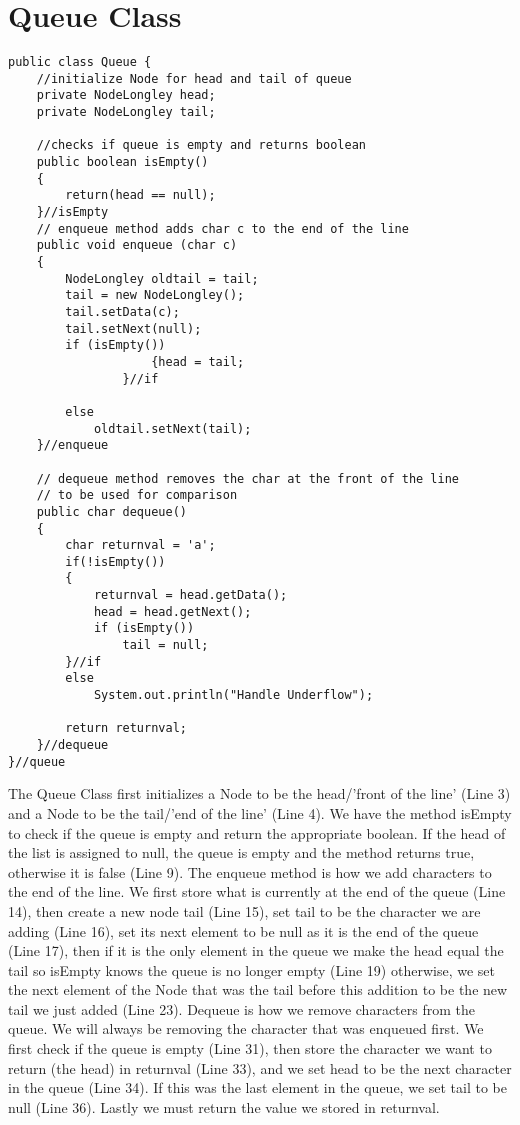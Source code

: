 \documentclass{article}
\begin{document}
\section{Queue Class}
\small
\begin{lstlisting}[frame =single,
backgroundcolor = \color{grey!12}]
public class Queue {
	//initialize Node for head and tail of queue
	private NodeLongley head;
	private NodeLongley tail;
	
	//checks if queue is empty and returns boolean
	public boolean isEmpty()
	{
		return(head == null);
	}//isEmpty
	// enqueue method adds char c to the end of the line 
	public void enqueue (char c) 
	{
		NodeLongley oldtail = tail;
		tail = new NodeLongley();
		tail.setData(c);
		tail.setNext(null);
		if (isEmpty())
    	        	{head = tail;
	        	}//if	
	       
		else
			oldtail.setNext(tail);
	}//enqueue
	
	// dequeue method removes the char at the front of the line 
	// to be used for comparison 
	public char dequeue()
	{
		char returnval = 'a';
		if(!isEmpty()) 
		{
			returnval = head.getData();
			head = head.getNext();
			if (isEmpty())
				tail = null;
		}//if
		else 
			System.out.println("Handle Underflow");
		
		return returnval;
	}//dequeue
}//queue
\end{lstlisting}
\large

The Queue Class first initializes a Node to be the head/'front of the line' (Line 3) and a Node to be the tail/'end of the line' (Line 4). We have the method isEmpty to check if the queue is empty and return the appropriate boolean. If the head of the list is assigned to null, the queue is empty and the method returns true, otherwise it is false (Line 9). The enqueue method is how we add characters to the end of the line. We first store what is currently at the end of the queue (Line 14), then create a new node tail (Line 15), set tail to be the character we are adding (Line 16), set its next element to be null as it is the end of the queue (Line 17), then if it is the only element in the queue we make the head equal the tail so isEmpty knows the queue is no longer empty (Line 19) otherwise, we set the next element of the Node that was the tail before this addition to be the new tail we just added (Line 23). Dequeue is how we remove characters from the queue. We will always be removing the character that was enqueued first. We first check if the queue is empty (Line 31), then store the character we want to return (the head) in returnval (Line 33), and we set head to be the next character in the queue (Line 34). If this was the last element in the queue, we set tail to be null (Line 36). Lastly we must return the value we stored in returnval. 
\end{document}
